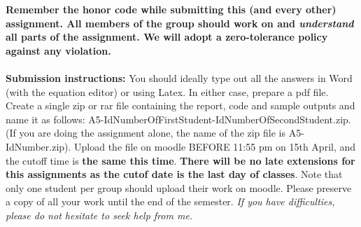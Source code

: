 \documentclass[11pt]{article}
\begin{document}
\maketitle

\textbf{Remember the honor code while submitting this (and every other) assignment. All members of the group should work on and \emph{understand} all parts of the assignment. We will adopt a \textbf{zero-tolerance policy} against any violation.}
\\
\\
\textbf{Submission instructions:} You should ideally type out all the answers in Word (with the equation editor) or using Latex. In either case, prepare a pdf file. Create a single zip or rar file containing the report, code and sample outputs and name it as follows: A5-IdNumberOfFirstStudent-IdNumberOfSecondStudent.zip. (If you are doing the assignment alone, the name of the zip file is A5-IdNumber.zip). Upload the file on moodle BEFORE 11:55 pm on 15th April, and the cutoff time is \textbf{the same this time}. \textbf{There will be no late extensions for this assignments as the cutof date is the last day of classes}. Note that only one student per group should upload their work on moodle. Please preserve a copy of all your work until the end of the semester. \emph{If you have difficulties, please do not hesitate to seek help from me.} 
\end{document}
